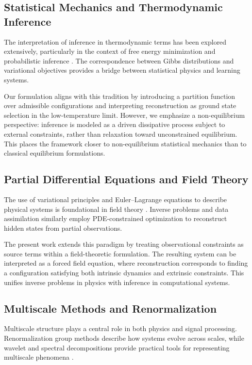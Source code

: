 \documentclass[12pt]{article}
\begin{document}
\subsection{Statistical Mechanics and Thermodynamic Inference}

The interpretation of inference in thermodynamic terms has been explored extensively, particularly in the context of free energy minimization and probabilistic inference \cite{mezard2009}. The correspondence between Gibbs distributions and variational objectives provides a bridge between statistical physics and learning systems.

Our formulation aligns with this tradition by introducing a partition function over admissible configurations and interpreting reconstruction as ground state selection in the low-temperature limit. However, we emphasize a non-equilibrium perspective: inference is modeled as a driven dissipative process subject to external constraints, rather than relaxation toward unconstrained equilibrium. This places the framework closer to non-equilibrium statistical mechanics than to classical equilibrium formulations.

\subsection{Partial Differential Equations and Field Theory}

The use of variational principles and Euler--Lagrange equations to describe physical systems is foundational in field theory \cite{evans2010}. Inverse problems and data assimilation similarly employ PDE-constrained optimization to reconstruct hidden states from partial observations.

The present work extends this paradigm by treating observational constraints as source terms within a field-theoretic formulation. The resulting system can be interpreted as a forced field equation, where reconstruction corresponds to finding a configuration satisfying both intrinsic dynamics and extrinsic constraints. This unifies inverse problems in physics with inference in computational systems.

\subsection{Multiscale Methods and Renormalization}

Multiscale structure plays a central role in both physics and signal processing. Renormalization group methods describe how systems evolve across scales, while wavelet and spectral decompositions provide practical tools for representing multiscale phenomena \cite{mallat2009}.
\end{document}
